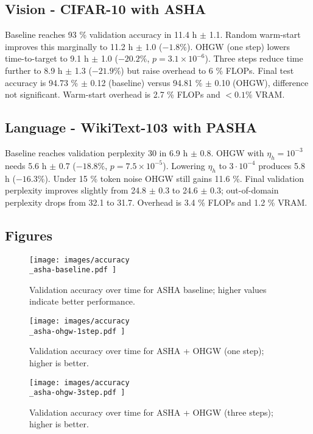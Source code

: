 \documentclass{article}
\begin{document}
\subsection{Vision - CIFAR-10 with ASHA}
Baseline reaches 93 \% validation accuracy in 11.4 h \(\pm\) 1.1. Random warm-start improves this marginally to 11.2 h \(\pm\) 1.0 (\(-1.8 \%\)). OHGW (one step) lowers time-to-target to 9.1 h \(\pm\) 1.0 (\(-20.2 \%\), \(p = 3.1 \times 10^{-6}\)). Three steps reduce time further to 8.9 h \(\pm\) 1.3 (\(-21.9 \%\)) but raise overhead to 6 \% FLOPs. Final test accuracy is 94.73 \% \(\pm\) 0.12 (baseline) versus 94.81 \% \(\pm\) 0.10 (OHGW), difference not significant. Warm-start overhead is 2.7 \% FLOPs and \(<0.1 \%\) VRAM.

\subsection{Language - WikiText-103 with PASHA}
Baseline reaches validation perplexity 30 in 6.9 h \(\pm\) 0.8. OHGW with \(\eta_h = 10^{-3}\) needs 5.6 h \(\pm\) 0.7 (\(-18.8 \%\), \(p = 7.5 \times 10^{-5}\)). Lowering \(\eta_h\) to \(3\cdot 10^{-4}\) produces 5.8 h (\(-16.3 \%\)). Under 15 \% token noise OHGW still gains 11.6 \%. Final validation perplexity improves slightly from 24.8 \(\pm\) 0.3 to 24.6 \(\pm\) 0.3; out-of-domain perplexity drops from 32.1 to 31.7. Overhead is 3.4 \% FLOPs and 1.2 \% VRAM.

\subsection{Figures}
\begin{figure}[H]
  \centering
  \texttt{[image:  images/accuracy\\\_asha-baseline.pdf ]}
  \caption{Validation accuracy over time for ASHA baseline; higher values indicate better performance.}
\end{figure}

\begin{figure}[H]
  \centering
  \texttt{[image:  images/accuracy\\\_asha-ohgw-1step.pdf ]}
  \caption{Validation accuracy over time for ASHA + OHGW (one step); higher is better.}
\end{figure}

\begin{figure}[H]
  \centering
  \texttt{[image:  images/accuracy\\\_asha-ohgw-3step.pdf ]}
  \caption{Validation accuracy over time for ASHA + OHGW (three steps); higher is better.}
\end{figure}
\end{document}
